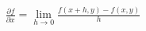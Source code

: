 \documentclass[preview]{standalone}
\begin{document}
\begin{align*}
\frac{\partial f}{\partial x} = \lim_{h \to 0} \frac{f(x+h, y) - f(x, y)}{h}
\end{align*}
\end{document}
